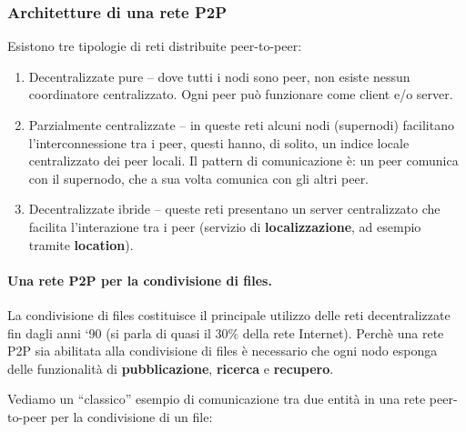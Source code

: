 \subsubsection{Architetture di una rete P2P}

Esistono tre tipologie di reti distribuite peer-to-peer:

\begin{enumerate}

 \item Decentralizzate pure -- dove tutti i nodi sono peer, non esiste nessun
       coordinatore centralizzato. Ogni peer può funzionare come client e/o server.

 \item Parzialmente centralizzate -- in queste reti alcuni nodi (supernodi)
       facilitano l’interconnessione tra i peer, questi hanno, di solito, un indice
       locale centralizzato dei peer locali. Il
       pattern di comunicazione è: un peer comunica con il supernodo, che a sua volta
       comunica con gli altri peer.

 \item Decentralizzate ibride -- queste reti presentano un server centralizzato
       che facilita l’interazione tra i peer (servizio di \textbf{localizzazione}, ad
       esempio tramite \textbf{location}).

\end{enumerate}

\paragraph{Una rete P2P per la condivisione di files.} La condivisione di files
costituisce il principale utilizzo delle reti decentralizzate fin dagli anni
`90 (si parla di quasi il $30\%$ della rete Internet). Perchè una rete P2P sia
abilitata alla condivisione di files è necessario che ogni nodo esponga delle
funzionalità di \textbf{pubblicazione}, \textbf{ricerca} e \textbf{recupero}.

Vediamo un ``classico'' esempio di comunicazione tra due entità in una rete
peer-to-peer per la condivisione di un file:

